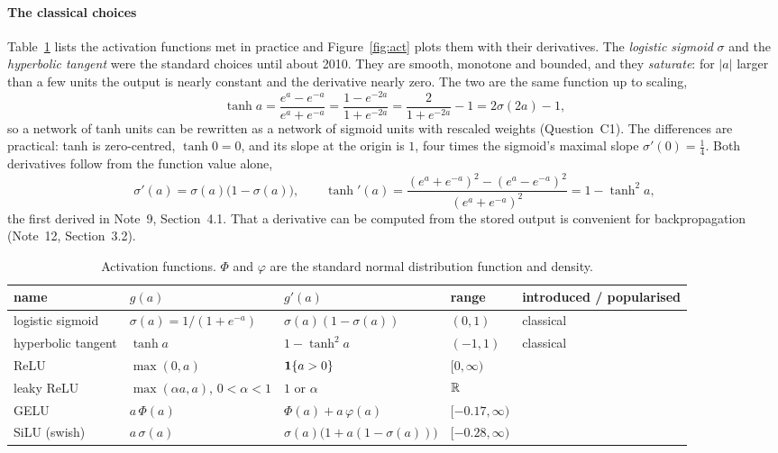 \documentclass[11pt]{article}
\begin{document}
\paragraph{The classical choices} Table~\ref{tab:act} lists the activation functions met in practice and
Figure~\ref{fig:act} plots them with their derivatives. The \emph{logistic sigmoid} $\sigma$ and the \emph{hyperbolic
tangent} were the standard choices until about 2010. They are smooth, monotone and bounded, and they
\emph{saturate}: for $|a|$ larger than a few units the output is nearly constant and the derivative nearly zero. The
two are the same function up to scaling,
\begin{equation}\label{eq:tanhsig}
  \tanh a = \frac{e^a - e^{-a}}{e^a + e^{-a}} = \frac{1 - e^{-2a}}{1 + e^{-2a}} = \frac{2}{1 + e^{-2a}} - 1 = 2\sigma(2a) - 1 ,
\end{equation}
so a network of tanh units can be rewritten as a network of sigmoid units with rescaled weights (Question~C1). The
differences are practical: tanh is zero-centred, $\tanh 0 = 0$, and its slope at the origin is $1$, four times the
sigmoid's maximal slope $\sigma'(0) = \frac14$. Both derivatives follow from the function value alone,
\[
  \sigma'(a) = \sigma(a)\big(1 - \sigma(a)\big), \qquad
  \tanh'(a) = \frac{(e^a + e^{-a})^2 - (e^a - e^{-a})^2}{(e^a + e^{-a})^2} = 1 - \tanh^2 a ,
\]
the first derived in Note~9, Section~4.1. That a derivative can be computed from the stored output is convenient for
backpropagation (Note~12, Section~3.2).

\begin{table}[htbp]
\centering\small
\caption{Activation functions. $\Phi$ and $\varphi$ are the standard normal distribution function and density.}
\label{tab:act}
\begin{tabular}{@{}lllll@{}}
\toprule
name & $g(a)$ & $g'(a)$ & range & introduced / popularised \\
\midrule
logistic sigmoid & $\sigma(a) = 1/(1 + e^{-a})$ & $\sigma(a)(1 - \sigma(a))$ & $(0, 1)$ & classical \\
hyperbolic tangent & $\tanh a$ & $1 - \tanh^2 a$ & $(-1, 1)$ & classical \\
ReLU & $\max(0, a)$ & $\mathbf{1}\!\left\{a > 0\right\}$ & $[0, \infty)$ & \cite{nair2010,glorot2011} \\
leaky ReLU & $\max(\alpha a, a)$, $0 < \alpha < 1$ & $1$ or $\alpha$ & $\mathbb{R}$ & \cite{maas2013} \\
GELU & $a\,\Phi(a)$ & $\Phi(a) + a\,\varphi(a)$ & $[-0.17, \infty)$ & \cite{hendrycks2016} \\
SiLU (swish) & $a\,\sigma(a)$ & $\sigma(a)\big(1 + a(1 - \sigma(a))\big)$ & $[-0.28, \infty)$ & \cite{elfwing2018,ramachandran2017} \\
\bottomrule
\end{tabular}
\end{table}
\end{document}
